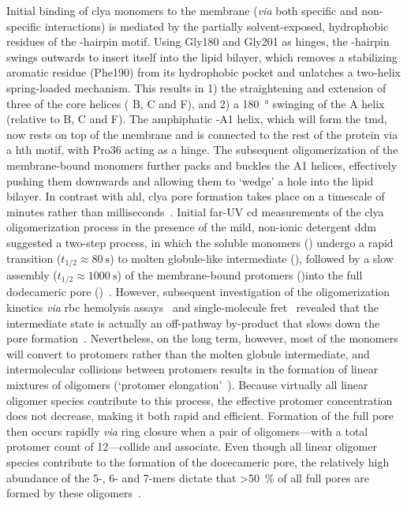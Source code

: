 Initial binding of \gls{clya} monomers to the membrane (\textit{via} both specific and non-specific
interactions) is mediated by the partially solvent-exposed, hydrophobic residues of the \tb-hairpin motif.
Using Gly180 and Gly201 as hinges, the \tb-hairpin swings outwards to insert itself into the lipid bilayer,
which removes a stabilizing aromatic residue (Phe190) from its hydrophobic pocket and unlatches a two-helix
spring-loaded mechanism. This results in 1) the straightening and extension of three of the core helices (\ta
B, \ta C and \ta F), and 2) a \SI{180}{\degree} swinging of the \ta A helix (relative to \ta B, \ta C and \ta
F). The amphiphatic \ta-A1 helix, which will form the \gls{tmd}, now rests on top of the membrane and is
connected to the rest of the protein via a \gls{hth} motif, with Pro36 acting as a hinge. The subsequent
oligomerization of the membrane-bound monomers further packs and buckles the \ta A1 helices, effectively
pushing them downwards and allowing them to `wedge' a hole into the lipid bilayer. In contrast with
\gls{ahl}, \gls{clya} pore formation takes place on a timescale of minutes rather than
milliseconds~\cite{Benke-2015}. Initial far-UV \gls{cd} measurements of the \gls{clya} oligomerization process
in the presence of the mild, non-ionic detergent \gls{ddm} suggested a two-step process, in which the soluble
monomers () undergo a rapid transition ($t_{1/2} \approx \SI{80}{\second}$) to molten globule-like
intermediate (), followed by a slow assembly  ($t_{1/2} \approx \SI{1000}{\second}$) of the
membrane-bound protomers ()into the full dodecameric pore ()~\cite{Eifler-2006}. However,
subsequent investigation of the oligomerization kinetics \textit{via} \gls{rbc} hemolysis
assays~\cite{Vaidyanathan-2014} and single-molecule \gls{fret}~\cite{Benke-2015} revealed that the
intermediate state is actually an off-pathway by-product that slows down the pore
formation~\cite{Roderer-2017}. Nevertheless, on the long term, however, most of the monomers will convert to
protomers rather than the molten globule intermediate, and intermolecular collisions between protomers results
in the formation of linear mixtures of oligomers (`protomer elongation'~\cite{Roderer-2017}). Because
virtually all linear oligomer species contribute to this process, the effective protomer concentration does
not decrease, making it both rapid and efficient. Formation of the full pore then occurs rapidly \textit{via}
ring closure when a pair of oligomers---with a total protomer count of 12---collide and associate. Even though
all linear oligomer species contribute to the formation of the docecameric pore, the relatively high abundance
of the 5-, 6- and 7-mers dictate that \SI{>50}{\percent} of all full pores are formed by these
oligomers~\cite{Benke-2015}.



